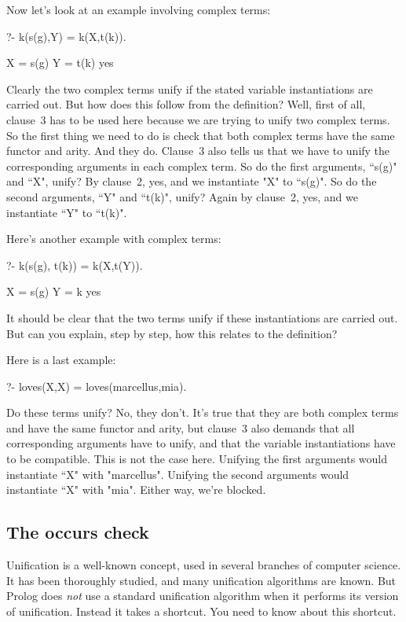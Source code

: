 Now let's look at an example involving complex terms:
\begin{LPNcodedisplay}
?- k(s(g),Y) = k(X,t(k)).

X = s(g)
Y = t(k)
yes
\end{LPNcodedisplay}
%
Clearly the two complex terms unify if the stated variable
instantiations are carried out. But how does this follow from the
definition? Well, first of all, clause~3 has to be used here because
we are trying to unify two complex terms.  So the first thing we need
to do is check that both complex terms have the same functor and
arity. And they do.  Clause~3 also tells us that we have to unify the
corresponding arguments in each complex term. So do the first
arguments, ``s(g)" and ``X", unify? By clause~2, yes, and we instantiate
"X" to ``s(g)". So do the second arguments, ``Y" and ``t(k)", unify?
Again by clause~2, yes, and we instantiate ``Y" to ``t(k)".

Here's another example with complex terms:
\begin{LPNcodedisplay}
?- k(s(g), t(k)) = k(X,t(Y)).

X = s(g)
Y = k
yes
\end{LPNcodedisplay}
%
It should be clear that the two terms unify if these instantiations
are carried out. But can you explain, step by step, how this relates
to the definition?

Here is a last example:
\begin{LPNcodedisplay}
?- loves(X,X) = loves(marcellus,mia).
\end{LPNcodedisplay}
%
Do these terms unify? No, they don't. It's true that they are both
complex terms and have the same functor and arity, but clause~3 also
demands that all corresponding arguments have to unify, and that the
variable instantiations have to be compatible. This is not the case
here. Unifying the first arguments would instantiate ``X" with
"marcellus". Unifying the second arguments would instantiate ``X" with
"mia". Either way, we're blocked.


\subsection*{The occurs check}\label{SUBSEC.L2.OCCURSCHECK}

Unification is a well-known concept, used in several branches of
computer science. It has been thoroughly studied, and many unification
algorithms are known. But Prolog does \textit{not} use a standard
unification algorithm when it performs its version of
unification. Instead it takes a shortcut.  You need to know about this
shortcut.

